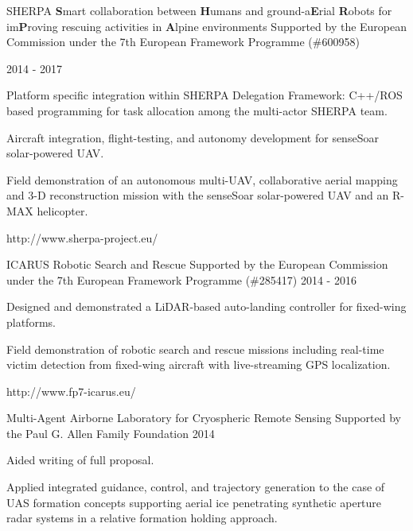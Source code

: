 \begin{cventries}
\cvprojwideentry
  	{SHERPA} %
  	{\textbf{S}mart collaboration between \textbf{H}umans and ground-a\textbf{E}rial \textbf{R}obots for im\textbf{P}roving rescuing activities in \textbf{A}lpine environments} %
    {Supported by the European Commission under the 7th European Framework Programme (\#600958)} %
    {\parbox{\linewidth}{\raggedright 2014 - 2017\linebreak}} %
    {
      \begin{cvitems} %
        \item {Platform specific integration within SHERPA Delegation Framework: C++/ROS based programming for task allocation among the multi-actor SHERPA team.}
        \item {Aircraft integration, flight-testing, and autonomy development for senseSoar solar-powered UAV.}
        \item {Field demonstration of an autonomous multi-UAV, collaborative aerial mapping and 3-D reconstruction mission with the senseSoar solar-powered UAV and an R-MAX helicopter.}
      \end{cvitems}
    } %
    {http://www.sherpa-project.eu/} %
    {\showprojectdescriptions}
    {}

\cvprojwideentry
  	{ICARUS} %
  	{Robotic Search and Rescue} %
    {Supported by the European Commission under the 7th European Framework Programme (\#285417)} %
    {2014 - 2016} %
    {
      \begin{cvitems} %
        \item {Designed and demonstrated a LiDAR-based auto-landing controller for fixed-wing platforms.}
        \item {Field demonstration of robotic search and rescue missions including real-time victim detection from fixed-wing aircraft with live-streaming GPS localization.}
      \end{cvitems}
    } %
    {http://www.fp7-icarus.eu/} %
    {\showprojectdescriptions}
    {}

\cvprojwideentry
  	{Multi-Agent Airborne Laboratory for Cryospheric Remote Sensing} %
  	{} %
    {Supported by the Paul G. Allen Family Foundation} %
    {2014} %
    {
      \begin{cvitems} %
        \item {Aided writing of full proposal.}
        \item {Applied integrated guidance, control, and trajectory generation to the case of UAS formation concepts supporting aerial ice penetrating synthetic aperture radar systems in a relative formation holding approach.}
      \end{cvitems}
    } %
    {} %
    {\showprojectdescriptions}
    {}
    

\end{cventries}

